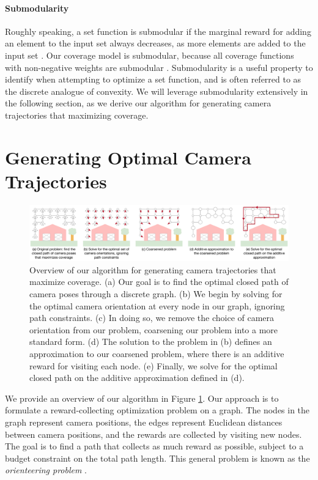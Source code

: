 \paragraph{Submodularity}
Roughly speaking, a set function is submodular if the marginal reward for adding an element to the input set always decreases, as more elements are added to the input set \cite{krause:2014}.
Our coverage model is submodular, because all coverage functions with non-negative weights are submodular \cite{krause:2014}.
Submodularity is a useful property to identify when attempting to optimize a set function, and is often referred to as the discrete analogue of convexity.
We will leverage submodularity extensively in the following section, as we derive our algorithm for generating camera trajectories that maximizing coverage. 

\section{Generating Optimal Camera Trajectories}
\label{sec:ch4:trajectories}

\begin{figure}[t]
\begin{center}
\includegraphics[width=6.0in]{images/2017_iccv/algorithm_overview.pdf}
\end{center}
\caption{
Overview of our algorithm for generating camera trajectories that maximize coverage.
(a) Our goal is to find the optimal closed path of camera poses through a discrete graph.
(b) We begin by solving for the optimal camera orientation at every node in our graph, ignoring path constraints.
(c) In doing so, we remove the choice of camera orientation from our problem, coarsening our problem into a more standard form.
(d) The solution to the problem in (b) defines an approximation to our coarsened problem, where there is an additive reward for visiting each node.
(e) Finally, we solve for the optimal closed path on the additive approximation defined in (d).
}
\label{fig:ch4:algorithm_overview}
\end{figure}

We provide an overview of our algorithm in Figure \ref{fig:ch4:algorithm_overview}.
Our approach is to formulate a reward-collecting optimization problem on a graph.
The nodes in the graph represent camera positions, the edges represent Euclidean distances between camera positions, and the rewards are collected by visiting new nodes.
The goal is to find a path that collects as much reward as possible, subject to a budget constraint on the total path length.
This general problem is known as the \emph{orienteering problem} \cite{gunawan:2016,vansteenwegena:2011}.

